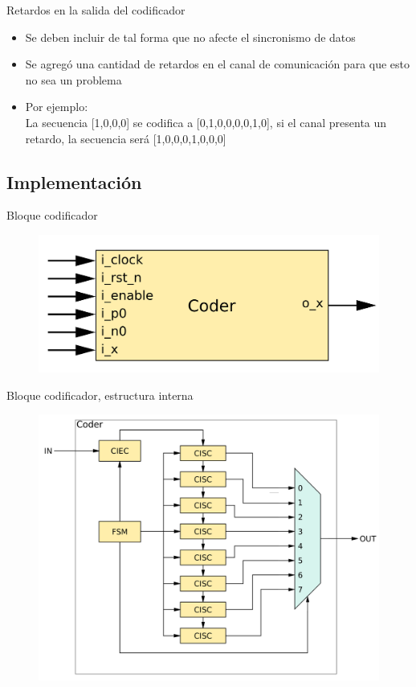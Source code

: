 \documentclass[xcolor=table]{beamer}
\begin{document}
\begin{frame}{Retardos en la salida del codificador}
 \begin{itemize}
     \item Se deben incluir de tal forma que no afecte el sincronismo de datos
      \item Se agregó una cantidad de retardos en el canal de comunicación para que esto no sea un problema

    \item Por ejemplo:\\
    La secuencia [1,0,0,0] se codifica a [0,1,0,0,0,0,1,0], si el canal presenta un retardo, la secuencia será [1,0,0,0,1,0,0,0]
     \end{itemize}
\end{frame}

\subsection{Implementación}

\begin{frame}{Bloque codificador}
    \begin{figure}
  \centering
  \includegraphics[width=0.70\paperwidth]{Diagramas/coder.png}%
\end{figure}
\end{frame}

\begin{frame}{Bloque codificador, estructura interna}
    
 \begin{figure}
  \centering
  \includegraphics[width=0.70\paperwidth]{Diagramas/internal_coder.png}%
\end{figure}
\end{frame}
\end{document}
